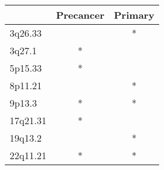 \begin{tabular}{lcc}
\toprule
{} & Precancer & Primary \\
\midrule
3q26.33  &           &       * \\
3q27.1   &         * &         \\
5p15.33  &         * &         \\
8p11.21  &           &       * \\
9p13.3   &         * &       * \\
17q21.31 &         * &         \\
19q13.2  &           &       * \\
22q11.21 &         * &       * \\
\bottomrule
\end{tabular}

